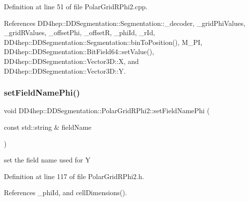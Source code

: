 Definition at line 51 of file Polar\+Grid\+R\+Phi2.\+cpp.



References D\+D4hep\+::\+D\+D\+Segmentation\+::\+Segmentation\+::\+\_\+decoder, \+\_\+grid\+Phi\+Values, \+\_\+grid\+R\+Values, \+\_\+offset\+Phi, \+\_\+offsetR, \+\_\+phi\+Id, \+\_\+r\+Id, D\+D4hep\+::\+D\+D\+Segmentation\+::\+Segmentation\+::bin\+To\+Position(), M\+\_\+\+PI, D\+D4hep\+::\+D\+D\+Segmentation\+::\+Bit\+Field64\+::set\+Value(), D\+D4hep\+::\+D\+D\+Segmentation\+::\+Vector3\+D\+::X, and D\+D4hep\+::\+D\+D\+Segmentation\+::\+Vector3\+D\+::Y.

\hypertarget{class_d_d4hep_1_1_d_d_segmentation_1_1_polar_grid_r_phi2_a6cd00f3574bc968232a95d1204238c14}{}\label{class_d_d4hep_1_1_d_d_segmentation_1_1_polar_grid_r_phi2_a6cd00f3574bc968232a95d1204238c14} 
\subsubsection{\texorpdfstring{set\+Field\+Name\+Phi()}{setFieldNamePhi()}}
{\footnotesize\ttfamily void D\+D4hep\+::\+D\+D\+Segmentation\+::\+Polar\+Grid\+R\+Phi2\+::set\+Field\+Name\+Phi (\begin{DoxyParamCaption}\item[{const std\+::string \&}]{field\+Name }\end{DoxyParamCaption})\hspace{0.3cm}{\ttfamily [inline]}}



set the field name used for Y 



Definition at line 117 of file Polar\+Grid\+R\+Phi2.\+h.



References \+\_\+phi\+Id, and cell\+Dimensions().

\hypertarget{class_d_d4hep_1_1_d_d_segmentation_1_1_polar_grid_r_phi2_aac669f48623b5176e941a1e66fde5877}{}\label{class_d_d4hep_1_1_d_d_segmentation_1_1_polar_grid_r_phi2_aac669f48623b5176e941a1e66fde5877} 

